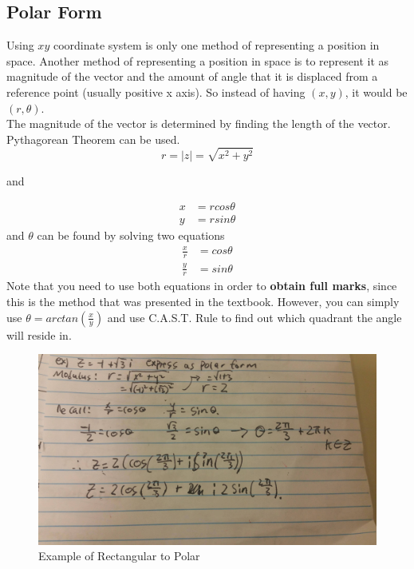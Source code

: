 \documentclass[12pt]{article}
\begin{document}
\subsection{Polar Form}
Using $xy$ coordinate system is only one method of representing a position in space. Another method of representing a position in space is to represent it as magnitude of the vector and the amount of angle that it is displaced from a reference point (usually positive x axis). So instead of having $(x,y)$, it would be $(r,\theta)$.\\
The magnitude of the vector is determined by finding the length of the vector. Pythagorean Theorem can be used.\\
\begin{equation}
r = |z| = \sqrt{x^2+y^2}
\end{equation}
\begin{centering}
and 
\end{centering}
\begin{equation}
\begin{split}
x &= rcos\theta\\
y &= rsin\theta
\end{split}
\end{equation}
and $\theta$ can be found by solving two equations 
\begin{equation}
\begin{split}
\frac{x}{r} &= cos\theta\\
\frac{y}{r} &= sin\theta
\end{split}
\end{equation}
Note that you need to use both equations in order to \textbf{obtain full marks}, since this is the method that was presented in the textbook. However, you can simply use $\theta = arctan(\frac{x}{y})$ and use C.A.S.T. Rule to find out which quadrant the angle will reside in.

\begin{figure}[!htb]
      	\centering
      	\includegraphics[scale=0.1]{PolarEx.jpg}
      	\caption{Example of Rectangular to Polar \label{fig:PolarEx}}
\end{figure}
\end{document}
